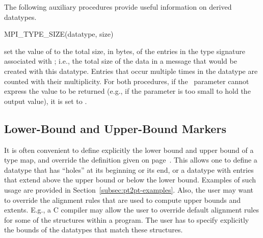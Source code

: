 The following auxiliary procedures provide useful information on
derived datatypes.

\begin{funcdef}{MPI\_TYPE\_SIZE}{(\mbox{datatype}, \mbox{size})}
\end{funcdef}

set the value of  to the total size, in bytes, of the entries in
the type signature
associated with ; i.e., the total size of
the data in a message that would be created with this datatype.  Entries that
occur multiple times in the datatype are counted with their multiplicity.
%
For both procedures, if the \OUT\ parameter cannot express the value to
be returned (e.g., if the parameter is too small to hold the output
value), it is set to .

\subsection{Lower-Bound and Upper-Bound Markers}
\label{subsec:pt2pt-markers}

It is often convenient to define explicitly the lower bound and upper
bound of a type map, and override the definition given
on page~\pageref{eq:pt2pt-extent}.
This allows one to define a datatype that
has ``holes'' at its beginning or its end, or a datatype with
entries that extend above the upper bound or below the lower bound.
Examples of
such usage are provided in Section~\ref{subsec:pt2pt-examples}.
Also, the user may want to override the alignment rules that are
used to compute upper bounds and extents.  E.g., a C compiler may allow
the user to override default alignment rules for some of the
structures within
a program.  The user has to specify explicitly the bounds of the datatypes
that match these structures.

